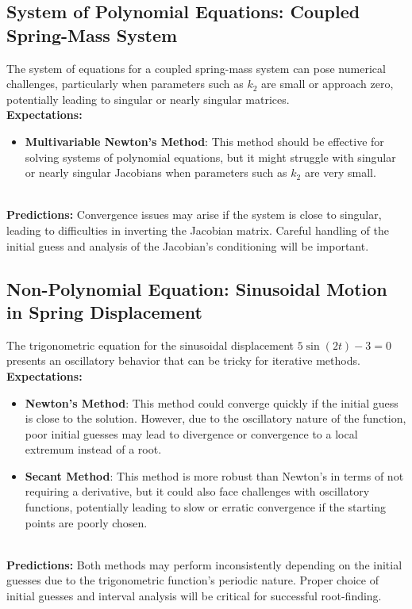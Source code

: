 \documentclass[12pt]{article}
\begin{document}
\subsection*{System of Polynomial Equations: Coupled Spring-Mass System}

\noindent The system of equations for a coupled spring-mass system can pose numerical challenges, particularly when parameters such as \( k_2 \) are small or approach zero, potentially leading to singular or nearly singular matrices.
\\
\noindent \textbf{Expectations:}
\begin{itemize}
    \item \textbf{Multivariable Newton’s Method}: This method should be effective for solving systems of polynomial equations, but it might struggle with singular or nearly singular Jacobians when parameters such as \( k_2 \) are very small.
\end{itemize}
\\
\textbf{Predictions:}
Convergence issues may arise if the system is close to singular, leading to difficulties in inverting the Jacobian matrix. Careful handling of the initial guess and analysis of the Jacobian’s conditioning will be important.

\subsection*{Non-Polynomial Equation: Sinusoidal Motion in Spring Displacement}

\noindent The trigonometric equation for the sinusoidal displacement \( 5 \sin(2t) - 3 = 0 \) presents an oscillatory behavior that can be tricky for iterative methods.
\\
\textbf{Expectations:}
\begin{itemize}
    \item \textbf{Newton’s Method}: This method could converge quickly if the initial guess is close to the solution. However, due to the oscillatory nature of the function, poor initial guesses may lead to divergence or convergence to a local extremum instead of a root.
    \item \textbf{Secant Method}: This method is more robust than Newton’s in terms of not requiring a derivative, but it could also face challenges with oscillatory functions, potentially leading to slow or erratic convergence if the starting points are poorly chosen.
\end{itemize}
\\
\noindent \textbf{Predictions:}
Both methods may perform inconsistently depending on the initial guesses due to the trigonometric function’s periodic nature. Proper choice of initial guesses and interval analysis will be critical for successful root-finding.
\end{document}
